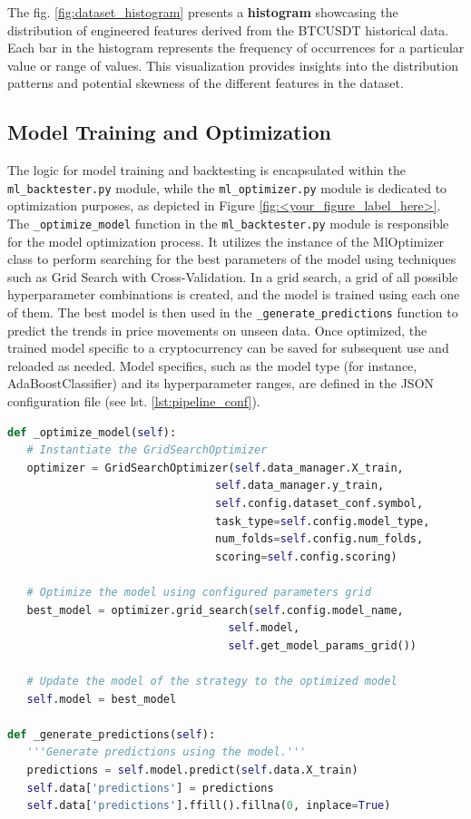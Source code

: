 The fig. \ref{fig:dataset_histogram} presents a \textbf{histogram} showcasing the distribution of engineered features derived from the BTCUSDT historical data. Each bar in the histogram represents the frequency of occurrences for a particular value or range of values. This visualization provides insights into the distribution patterns and potential skewness of the different features in the dataset.



\subsection{Model Training and Optimization}
The logic for model training and backtesting is encapsulated within the \texttt{ml\_backtester.py} module,
while the \texttt{ml\_optimizer.py} module is dedicated to optimization purposes, as depicted in Figure \ref{fig:<your_figure_label_here>}.
The \texttt{\_optimize\_model} function in the \texttt{ml\_backtester.py} module is responsible for the model optimization process.
It utilizes the instance of the MlOptimizer class to perform searching for the best parameters of the model using techniques such as Grid Search with Cross-Validation.
In a grid search, a grid of all possible hyperparameter combinations is created, and the model is trained using each one of them. The best model is then used in the \texttt{\_generate\_predictions}
function to predict the trends in price movements on unseen data. Once optimized, the trained model specific to a cryptocurrency can be saved for subsequent use and reloaded as needed.
Model specifics, such as the model type (for instance, AdaBoostClassifier) and its hyperparameter ranges, are defined in the JSON configuration file (see lst. \ref{lst:pipeline_conf}).

\begin{lstlisting}[style=pythonstyle, language=Python, caption={Function of MlBacktester class for model optimization and predictions.},  captionpos=b, label=lst:add_features_function]
def _optimize_model(self):
   # Instantiate the GridSearchOptimizer
   optimizer = GridSearchOptimizer(self.data_manager.X_train,
                                self.data_manager.y_train,
                                self.config.dataset_conf.symbol,
                                task_type=self.config.model_type,
                                num_folds=self.config.num_folds,
                                scoring=self.config.scoring)

   # Optimize the model using configured parameters grid
   best_model = optimizer.grid_search(self.config.model_name,
                                  self.model,
                                  self.get_model_params_grid())

   # Update the model of the strategy to the optimized model
   self.model = best_model

def _generate_predictions(self):
   '''Generate predictions using the model.'''
   predictions = self.model.predict(self.data.X_train)
   self.data['predictions'] = predictions
   self.data['predictions'].ffill().fillna(0, inplace=True)

\end{lstlisting}

